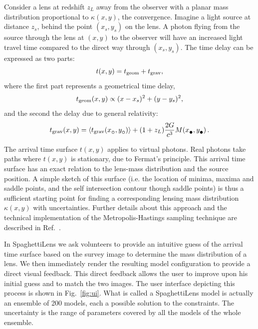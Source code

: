 \documentclass{ws-procs975x65}
\newcommand{\spl}{SpaghettiLens\xspace}
\newcommand{\icite}[1]{Ref.~\refcite{#1}}  %
\newcommand{\figref}[1]{Fig.~\ref{fig:#1}}
\newcommand{\tgeom}{t_{\rm geom}}
\newcommand{\tgrav}{t_{\rm grav}}
\newcommand{\subcirc}{{\lower.33ex\hbox{$\circ$}}}
\newcommand{\subbullet}{{\lower.33ex\hbox{$\bullet$}}}
\begin{document}
Consider a lens at redshift $z_L$ away from the observer with a planar mass distribution proportional to $\kappa(x,y)$, the convergence.
Imagine a light source at distance $z_s$, behind the point $(x_s,y_s)$ on the lens.
A photon flying from the source through the lens at $(x,y)$ to the observer will have an increased light travel time compared to the direct way through $(x_s,y_s)$.
The time delay can be expressed as two parts:
\begin{equation*}  \label{eq:tarriv}
  t(x,y) = t_{\rm geom} + t_{\rm grav} ,
\end{equation*}
where the first part represents a geometrical time delay,
\begin{equation*} \label{eq:tgeom}
  \tgeom(x,y) \propto (x-x_s)^2 + (y-y_s)^2 ,
\end{equation*}
and the second the delay due to general relativity:
\begin{equation*} \label{eq:tgrav}
  \tgrav(x,y) = \left\langle \tgrav(x_\subcirc,y_\subcirc) \right\rangle
                + (1+z_L) \frac{2G}{c^3} M(x_\subbullet,y_\subbullet) \,.
\end{equation*}

The arrival time surface $t(x,y)$ applies to virtual photons.
Real photons take paths where $t(x,y)$ is stationary, due to Fermat's principle.
This arrival time surface has an exact relation to the lens-mass distribution and the source position.
A simple sketch of this surface (i.e. the location of minima, maxima and saddle points, and the self intersection contour though saddle points) is thus a sufficient starting point for finding a corresponding lensing mass distribution $\kappa(x,y)$ with uncertainties.
Further details about this approach and the technical implementation of the Metropolis-Hastings sampling technique are described in \icite{Lubini2012}.

In \spl we ask volunteers to provide an intuitive guess of the arrival time surface based on the survey image to determine the mass distribution of a lens.
We then immediately render the resulting model configuration to provide a direct visual feedback.
This direct feedback allows the user to improve upon his initial guess and to match the two images.
The user interface depicting this process is shown in \figref{ui}.
What is called a \spl model is actually an ensemble of 200 models, each a possible solution to the constraints. The uncertainty is the range of parameters covered by all the models of the whole ensemble.
\end{document}
